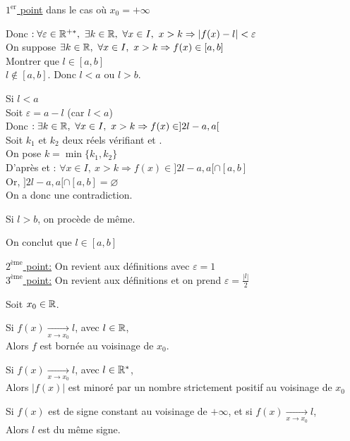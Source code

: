 \documentclass[12pt,twoside,a4paper]{article}
\begin{document}
		\begin{preuve}
			\begin{flushleft}
				\underline{$1^{\text{er}}$ point} dans le cas o\`u $x_0=+\infty$
				\begin{tab}
					Donc $:\forall \varepsilon\in\R^{+*},\ \exists k\in\R,\ \forall x\in I,\ x>k\Rightarrow \left| f(x)-l \right| <\varepsilon$\\
					On suppose $\exists k\in\R,\ \forall x\in I,\ x>k\Rightarrow f(x)\in[a,b]$\\
					Montrer que $l\in[a,b]$\\
					 $l\notin [a,b]$. Donc $l<a$ ou $l>b$.
					\begin{liste}
						\item Si $l<a$\\
							Soit $\varepsilon=a-l$ (car $l<a$)\\
							Donc $:\exists k\in\R,\ \forall x\in I,\ x>k\Rightarrow f(x)\in ]2l-a,a[$\\
							Soit $k_1$ et $k_2$ deux r\'eels v\'erifiant  et .\\
							On pose $k=\min\{k_1,k_2\}$\\
							D'apr\`es  et : $\forall x\in I,\ x>k\Rightarrow f(x)\in ]2l-a,a[\cap[a,b]$\\
							Or, $]2l-a,a[\cap[a,b]=\varnothing$\\
							On a donc une contradiction.
						\item Si $l>b$, on proc\`ede de m\^eme.
					\end{liste}
					On conclut que $l\in[a,b]$
				\end{tab}
				\underline{$2^{\text{\`eme}}$ point:} On revient aux d\'efinitions avec $\varepsilon=1$\\
				\underline{$3^{\text{\`eme}}$ point:} On revient aux d\'efinitions et on prend $\varepsilon=\frac{|l|}{2}$
			\end{flushleft}
		\end{preuve}
		\begin{prop}
			Soit $x_0\in \mathbb{R}$.
			\begin{liste}
				\item Si $f(x)\mathop{\longrightarrow}\limits_{x\rightarrow x_0}l$, avec $l\in\mathbb{R}$,\\
					Alors $f$ est born\'ee au voisinage de $x_0$.
				\item Si $f(x)\mathop{\longrightarrow}\limits_{x\rightarrow x_0} l$, avec $l\in\mathbb{R}^{*}$,\\
					Alors $|f(x)|$ est minor\'e par un nombre strictement positif au voisinage de $x_0$
				\item Si $f(x)$ est de signe constant au voisinage de $+\infty$, et si $f(x)\mathop{\longrightarrow}\limits_{x\rightarrow x_0}l$,\\
					Alors $l$ est du m\^eme signe.
			\end{liste}
		\end{prop}
\end{document}
